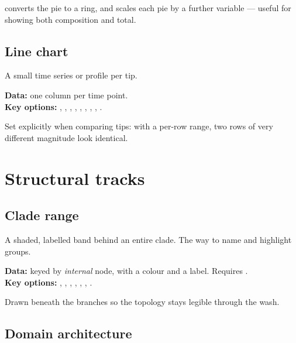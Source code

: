 converts the pie to a ring, and  scales each pie by
a further variable --- useful for showing both composition and total.


\subsection{Line chart}

A small time series or profile per tip.

\textbf{Data:} one column per time point.\\
\textbf{Key options:} , , ,
, , , ,
, .

Set  explicitly when comparing tips: with a per-row range, two
rows of very different magnitude look identical.


\section{Structural tracks}

\subsection{Clade range}

A shaded, labelled band behind an entire clade. The way to name and highlight
groups.

\textbf{Data:} keyed by \emph{internal} node, with a colour and a label. Requires
.\\
\textbf{Key options:} , ,
, , , ,
.

Drawn beneath the branches so the topology stays legible through the wash.


\subsection{Domain architecture}

